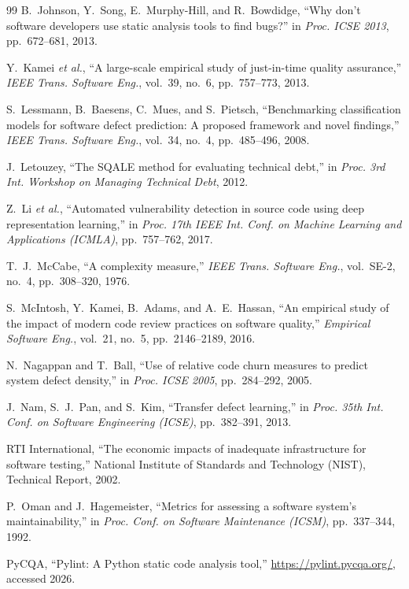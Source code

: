\documentclass[12pt, oneside]{report}
\begin{document}
\begin{singlespace}
\begin{thebibliography}{99}
B.~Johnson, Y.~Song, E.~Murphy-Hill, and R.~Bowdidge,
``Why don't software developers use static analysis tools to find bugs?''
in \textit{Proc. ICSE 2013}, pp.~672--681, 2013.

Y.~Kamei \textit{et al.},
``A large-scale empirical study of just-in-time quality assurance,''
\textit{IEEE Trans. Software Eng.}, vol.~39, no.~6, pp.~757--773, 2013.

S.~Lessmann, B.~Baesens, C.~Mues, and S.~Pietsch,
``Benchmarking classification models for software defect prediction:
A proposed framework and novel findings,''
\textit{IEEE Trans. Software Eng.}, vol.~34, no.~4, pp.~485--496, 2008.

J.~Letouzey,
``The SQALE method for evaluating technical debt,''
in \textit{Proc. 3rd Int. Workshop on Managing Technical Debt}, 2012.

Z.~Li \textit{et al.},
``Automated vulnerability detection in source code using deep representation learning,''
in \textit{Proc. 17th IEEE Int. Conf. on Machine Learning and Applications (ICMLA)},
pp.~757--762, 2017.

T.~J.~McCabe,
``A complexity measure,''
\textit{IEEE Trans. Software Eng.}, vol.~SE-2, no.~4, pp.~308--320, 1976.

S.~McIntosh, Y.~Kamei, B.~Adams, and A.~E.~Hassan,
``An empirical study of the impact of modern code review practices on software quality,''
\textit{Empirical Software Eng.}, vol.~21, no.~5, pp.~2146--2189, 2016.

N.~Nagappan and T.~Ball,
``Use of relative code churn measures to predict system defect density,''
in \textit{Proc. ICSE 2005}, pp.~284--292, 2005.

J.~Nam, S.~J.~Pan, and S.~Kim,
``Transfer defect learning,''
in \textit{Proc. 35th Int. Conf. on Software Engineering (ICSE)},
pp.~382--391, 2013.

RTI International,
``The economic impacts of inadequate infrastructure for software testing,''
National Institute of Standards and Technology (NIST), Technical Report, 2002.

P.~Oman and J.~Hagemeister,
``Metrics for assessing a software system's maintainability,''
in \textit{Proc. Conf. on Software Maintenance (ICSM)}, pp.~337--344, 1992.

PyCQA,
``Pylint: A Python static code analysis tool,''
\url{https://pylint.pycqa.org/}, accessed 2026.


\end{thebibliography}
\end{singlespace}
\end{document}
